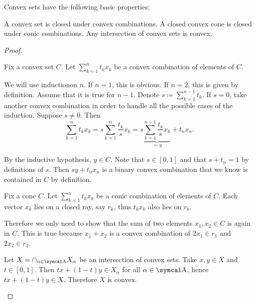 \begin{proposition}\label{thm:convex_set_properties}
  Convex sets have the following basic properties:

  \begin{propenum}
     A convex set is closed under convex combinations.
     A closed convex cone is closed under conic combinations.
     Any intersection of convex sets is convex.
  \end{propenum}
\end{proposition}
\begin{proof}
  \begin{description}
     Fix a convex set \( C \). Let \( \sum_{k=1}^n t_k x_k \) be a convex combination of elements of \( C \).

    We will use induction\IND on \( n \). If \( n = 1 \), this is obvious. If \( n = 2 \), this is given by definition. Assume that it is true for \( n - 1 \). Denote \( s \coloneqq \sum_{k=1}^{n-1} t_k \). If \( s = 0 \), take another convex combination in order to handle all the possible cases of the induction. Suppose \( s \neq 0 \). Then
    \begin{equation*}
      \sum_{k=1}^n t_k x_k
      =
      s \sum_{k=1}^n \frac {t_k} s x_k
      =
      s \underbrace{\sum_{k=1}^{n-1} \frac {t_k} s x_k}_{\eqqcolon y} + t_n x_n.
    \end{equation*}

    By the inductive hypothesis, \( y \in C \). Note that \( s \in [0, 1] \) and that \( s + t_n = 1 \) by definitions of \( s \). Then \( s y + t_n x_n \) is a binary convex combination that we know is contained in \( C \) by definition.

     Fix a cone \( C \). Let \( \sum_{k=1}^n t_k x_k \) be a conic combination of elements of \( C \). Each vector \( x_k \) lies on a closed ray, say \( r_k \), thus \( t_k x_k \) also lies on \( r_k \).

    Therefore we only need to show that the sum of two elements \( x_1, x_2 \in C \) is again in \( C \). This is true because \( x_1 + x_2 \) is a convex combination of \( 2x_1 \in r_1 \) and \( 2x_2 \in r_2 \).

     Let \( X = \cap_{\alpha \in \CA} X_\alpha \) be an intersection of convex sets. Take \( x, y \in X \) and \( t \in [0, 1] \). Then \( tx + (1-t)y \in X_\alpha \) for all \( \alpha \in \CA \), hence \( tx + (1-t)y \in X \). Therefore \( X \) is convex.
  \end{description}
\end{proof}

